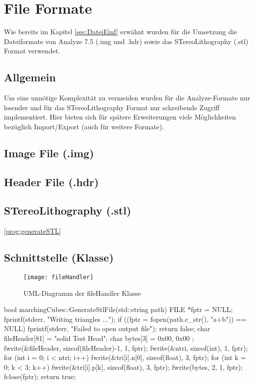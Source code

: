 \section{File Formate}
Wie bereits im Kapitel \ref{sec:DateiEinf} erwähnt wurden für die Umsetzung die Dateiformate von Analyze 7.5 (.img und .hdr) sowie das STereoLithography (.stl) Format verwendet.
\subsection{Allgemein}
Um eine unnötige Komplexität zu vermeiden wurden für die Analyze-Formate nur lesender und für das STereoLithography Format nur schreibende Zugriff implementiert. Hier bieten sich für spätere Erweiterungen viele Möglichkeiten bezüglich Import/Export (auch für weitere Formate). 
\subsection{Image File (.img)}

\subsection{Header File (.hdr)}

\subsection{STereoLithography (.stl)}
\ref{prog:generateSTL}
\subsection{Schnittstelle (Klasse)}
\begin{figure}[H]
	\centering
	\texttt{[image: fileHandler]}
	\caption{UML-Diagramm der fileHandler Klasse}
	\label{fig:fileHandler}
\end{figure}
\begin{program}
	\caption{Generierung einer STL-Datei}
	\label{prog:generateSTL}
	\begin{CCode}
	bool marchingCubes::GenerateStlFile(std::string path){
		FILE *fptr = NULL;
		fprintf(stderr, "Writing triangles ...\n");
		if ((fptr = fopen(path.c_str(), "a+b")) == NULL) {
			fprintf(stderr, "Failed to open output file\n");
			return false;
		}
		char fileHeader[81] = "solid Test Head";
		char bytes[3] = { 0x00, 0x00 };
		fwrite(&fileHeader, sizeof(fileHeader)-1, 1, fptr);
		fwrite(&ntri, sizeof(int), 1, fptr);
		for (int i = 0; i < ntri; i++) {
			fwrite(&tri[i].n[0], sizeof(float), 3, fptr);
			for (int k = 0; k < 3; k++)  {
				fwrite(&tri[i].p[k], sizeof(float), 3, fptr);
			}
			fwrite(bytes, 2, 1, fptr);
		}
		fclose(fptr);
		return true;
	}
	\end{CCode}
\end{program}

